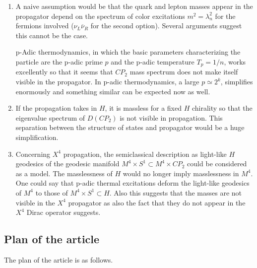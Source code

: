 \documentclass[10pt,epsf]{article}
\begin{document}
\begin{enumerate}

\item A naive assumption would be that the quark and lepton masses appear in the propagator depend on the spectrum of color excitations $m^2=\lambda_n^2$ for the fermions involved ($\nu_L\overline{\nu}_R$ for the second option). Several arguments suggest this cannot be the case.

p-Adic thermodynamics, in which the  basic parameters characterizing the particle are the p-adic prime  $p$  and the p-adic temperature $T_p= 1/n$,  works excellently so that it seems that $CP_2$ mass spectrum does not make itself visible in the propagator. In p-adic thermodynamics, a large $p \simeq  2^k$,   simplifies enormously and something similar can be expected now as well.

\item    If the propagation takes in $H$, it is massless for a fixed $H$ chirality so that  the eigenvalue spectrum  of $D(CP_2)$  is not visible in propagation.  This separation between the structure of states and propagator  would be a huge simplification.

\item  Concerning $X^4$ propagation, the semiclassical description as light-like $H$ geodesics of the geodesic manifold $M^4\times S^1\subset M^4\times CP_2$ could be considered as a model. The masslessness of $H$ would no longer imply   masslessness in  $M^4$. One could say that p-adic thermal excitations  deform the light-like geodesics of $M^4$ to those of $M^4\times S^1\subset H$.  Also this suggests that the masses are not visible in the $X^4$  propagator as also the fact that they do not appear in the $X^4$ Dirac operator suggests. 

\end{enumerate}



\subsection{Plan of the article}

The plan of the article is as follows.
\end{document}
